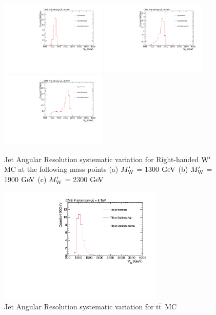 \begin{figure}[htcb]
\begin{center}
\includegraphics[width=0.45\textwidth]{AN-13-004/figs/Signal_M1300_EtaScaling}
\includegraphics[width=0.45\textwidth]{AN-13-004/figs/Signal_M1900_EtaScaling}
\includegraphics[width=0.45\textwidth]{AN-13-004/figs/Signal_M2300_EtaScaling}
\caption{
Jet Angular Resolution systematic variation for Right-handed $\mathrm{W}^\prime$ MC at the following mass points
(a) $M_\mathrm{W}^\prime$ = 1300$~\mathrm{GeV}$ 
(b) $M_\mathrm{W}^\prime$ = 1900$~\mathrm{GeV}$
(c) $M_\mathrm{W}^\prime$ = 2300$~\mathrm{GeV}$ 
}
\label{figs:signalJAR}
\end{center}
\end{figure}

\begin{figure}[htcb]
\begin{center}
\includegraphics[width=0.7\textwidth]{AN-13-004/figs/TTbar_EtaScaling}
\caption{Jet Angular Resolution systematic variation for $\mathrm{t\overline{t}}$ MC}
\label{figs:ttbarJAR}
\end{center}
\end{figure}

